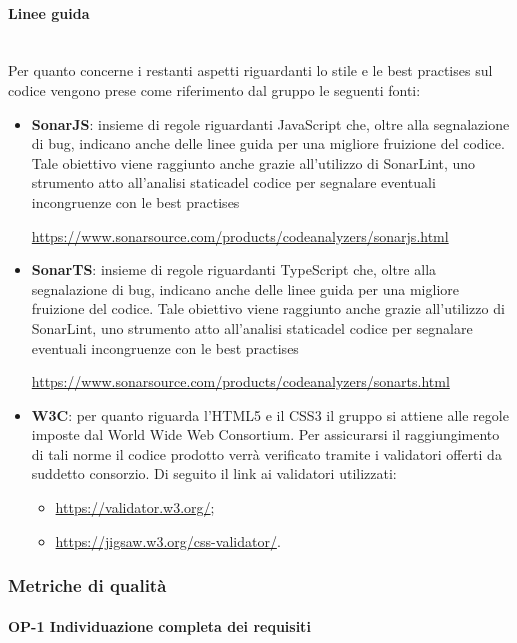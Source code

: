 			\paragraph*{Linee guida}\mbox{}\\ [1mm]
			Per quanto concerne i restanti aspetti riguardanti lo stile e le best practises sul codice vengono prese come riferimento dal gruppo le seguenti fonti:
			\begin{itemize}
				\item \textbf{SonarJS}: insieme di regole riguardanti JavaScript che, oltre alla segnalazione di bug, indicano anche delle linee guida per una migliore fruizione del codice. Tale obiettivo viene raggiunto anche grazie all'utilizzo di SonarLint, uno strumento atto all'analisi statica\glosp del codice per segnalare eventuali incongruenze con le best practises
				\begin{center}
				\url{https://www.sonarsource.com/products/codeanalyzers/sonarjs.html}
				\end{center}	
				\item \textbf{SonarTS}: insieme di regole riguardanti TypeScript che, oltre alla segnalazione di bug, indicano anche delle linee guida per una migliore fruizione del codice. Tale obiettivo viene raggiunto anche grazie all'utilizzo di SonarLint, uno strumento atto all'analisi statica\glosp del codice per segnalare eventuali incongruenze con le best practises
				\begin{center}
				\url{https://www.sonarsource.com/products/codeanalyzers/sonarts.html}
				\end{center}
				\item \textbf{W3C}: per quanto riguarda l'HTML5 e il CSS3 il gruppo si attiene alle regole imposte dal World Wide Web Consortium. Per assicurarsi il raggiungimento di tali norme il codice prodotto verrà verificato tramite i validatori offerti da suddetto consorzio. Di seguito il link ai validatori utilizzati:
				\begin{itemize}
					\item \url{https://validator.w3.org/};
					\item \url{https://jigsaw.w3.org/css-validator/}.
				\end{itemize}
			\end{itemize}
		
	\subsubsection{Metriche di qualità}
		\paragraph{OP-1 Individuazione completa dei requisiti}
